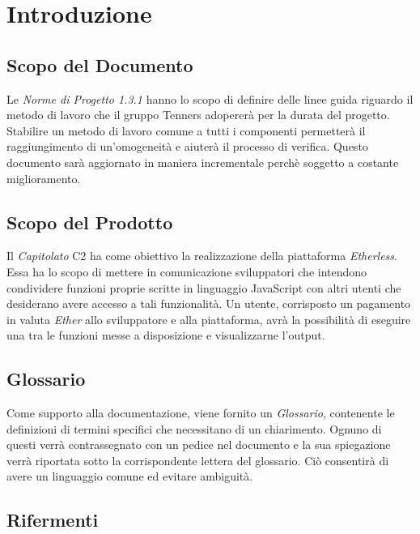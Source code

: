 \section{Introduzione}

\subsection{Scopo del Documento}
Le \textit{Norme di Progetto 1.3.1\doc} hanno lo scopo di definire delle linee guida riguardo il metodo di lavoro che il gruppo Tenners adopererà per la durata del progetto. Stabilire un metodo di lavoro comune a tutti i componenti permetterà il raggiungimento di un'omogeneità e aiuterà il processo di verifica. Questo documento sar\`a aggiornato in maniera incrementale perchè soggetto a costante miglioramento.

\subsection{Scopo del Prodotto}
Il \textit{Capitolato\glo} C2 ha come obiettivo la realizzazione della piattaforma \textit{Etherless}. Essa ha lo scopo di mettere in comunicazione sviluppatori che intendono condividere funzioni proprie scritte in linguaggio JavaScript con altri utenti che desiderano avere accesso a tali funzionalità. Un utente, corrisposto un pagamento in valuta \textit{Ether\glos} allo sviluppatore e alla piattaforma, avrà la possibilità di eseguire una tra le funzioni messe a disposizione e visualizzarne l'output. 


\subsection{Glossario}
Come supporto alla documentazione, viene fornito un \textit{Glossario}\docs,
contenente le definizioni di termini specifici che necessitano di un chiarimento.
Ognuno di questi verr\`a contrassegnato con un pedice \glo nel documento e la sua
spiegazione verr\`a riportata sotto la corrispondente lettera del glossario. Ci\`o
consentir\`a di avere un linguaggio comune ed evitare ambiguit\`a.

\subsection{Rifermenti}

